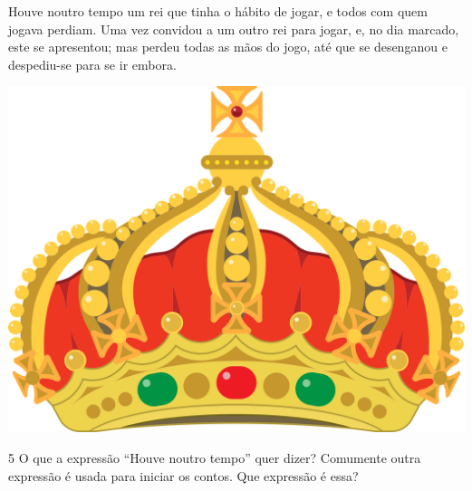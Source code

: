 \begin{myquote}


\begin{minipage}{0.6\textwidth}
Houve noutro tempo um rei que tinha o hábito de jogar, e todos com
quem jogava perdiam. Uma vez convidou a um outro rei para jogar, e, no
dia marcado, este se apresentou; mas perdeu todas as mãos do jogo, até
que se desenganou e despediu-se para se ir embora.
\end{minipage}
\hfill
\begin{minipage}{0.35\textwidth}
  \centering
  \includegraphics[width=\textwidth]{./imgSAEB_7_POR/media/image35.png}
\end{minipage} %


\end{myquote}

\num{5} O que a expressão ``Houve noutro tempo'' quer dizer? Comumente outra
expressão é usada para iniciar os contos. Que expressão é essa?


